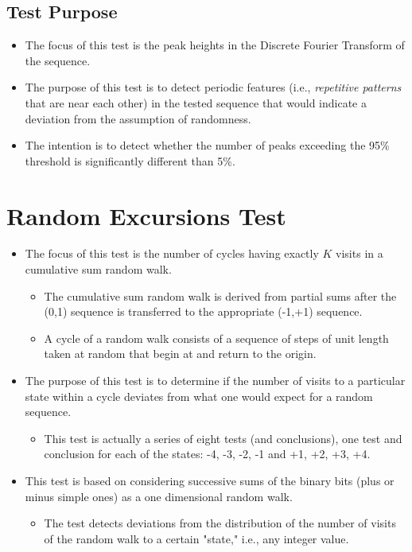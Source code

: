 \documentclass[12pt,openany]{book}
\theoremstyle{definition}
\begin{document}
	\subsection*{Test Purpose}
	\begin{itemize}
		\item The focus of this test is the peak heights in the Discrete Fourier Transform of the sequence.
		\item The purpose of this test is to detect periodic features (i.e., \textit{repetitive patterns} that are near each other) in the tested sequence that would indicate a deviation from the assumption of randomness.
		\item The intention is to detect whether the number of peaks exceeding the 95\% threshold is significantly different than 5\%.
	\end{itemize}

	\section*{Random Excursions Test}
	
	\begin{itemize}
		\item The focus of this test is the number of cycles having exactly \( K \) visits in a cumulative sum random walk.
		\begin{itemize}
			\item The cumulative sum random walk is derived from partial sums after the (0,1) sequence is transferred to the appropriate (-1,+1) sequence.
			\item A cycle of a random walk consists of a sequence of steps of unit length taken at random that begin at and return to the origin.
		\end{itemize}
		\item The purpose of this test is to determine if the number of visits to a particular state within a cycle deviates from what one would expect for a random sequence.
		\begin{itemize}
			\item This test is actually a series of eight tests (and conclusions), one test and conclusion for each of the states: -4, -3, -2, -1 and +1, +2, +3, +4.
		\end{itemize}
		\item This test is based on considering successive sums of the binary bits (plus or minus simple ones) as a one dimensional random walk.
		\begin{itemize}
			\item The test detects deviations from the distribution of the number of visits of the random walk to a certain "state," i.e., any integer value.
		\end{itemize}
	\end{itemize}
\end{document}
